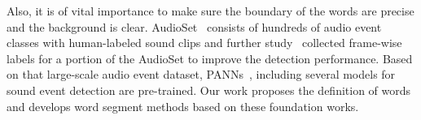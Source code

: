 
Also, it is of vital importance to make sure the boundary of the words are 
precise and the background is clear. AudioSet~\cite{gemmeke2017audio} 
consists of hundreds of audio event classes with human-labeled sound clips and further study~\cite{hershey2021benefit} collected frame-wise labels for a portion of the AudioSet to improve the detection performance. Based on that large-scale audio event dataset, PANNs~\cite{kong2020panns}, including several models for sound event detection are pre-trained. Our work proposes the definition of words and develops word segment methods based on these foundation works.
